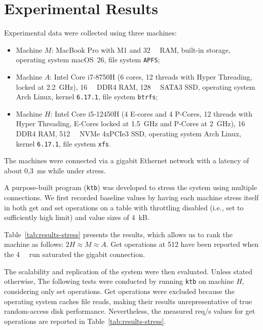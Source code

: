 \section{Experimental Results}
\label{sec:results}

Experimental data were collected using three machines:
\begin{itemize}
    \item Machine $M$: MacBook Pro with M1 and \SI{32}{\giga\byte} RAM, built-in storage, operating system macOS~26, file system \texttt{APFS};
    \item Machine $A$: Intel Core i7-8750H (6 cores, 12 threads with Hyper Threading, locked at \SI{2.2}{\giga\hertz}), \SI{16}{\giga\byte} DDR4 RAM, \SI{128}{\giga\byte} SATA3 SSD, operating system Arch Linux, kernel \texttt{6.17.1}, file system \texttt{btrfs};
    \item Machine $H$: Intel Core i5-12450H (4 E-cores and 4 P-Cores, 12 threads with Hyper Threading, E-Cores locked at \SI{1.5}{\giga\hertz} and P-Cores at \SI{2}{\giga\hertz}), \SI{16}{\giga\byte} DDR4 RAM, \SI{512}{\giga\byte} NVMe 4xPCIe3 SSD, operating system Arch Linux, kernel \texttt{6.17.1}, file system \texttt{xfs}.
\end{itemize}

The machines were connected via a gigabit Ethernet network with a latency of about 0{,}3~ms while under stress.

A purpose-built program (\texttt{ktb}) was developed to stress the system using multiple connections.
We first recorded baseline values by having each machine stress itself in both get and set operations
on a table with throttling disabled (i.e., set to sufficiently high limit) and value sizes of 4~kB\@.

Table~\ref{tab:results-stress} presents the results, which allows us to rank the machine as follows: $2H \approx M \approx A$.
Get operations at \SI{512}{\byte} have been reported when the \SI{4}{\kilo\byte} run saturated the gigabit connection.

The scalability and replication of the system were then evaluated.
Unless stated otherwise, The following tests were conducted by running \texttt{ktb} on machine $H$, considering only set operations.
Get operations were excluded because the operating system caches file reads, making their results unrepresentative of true random-access disk performance.
Nevertheless, the measured req/s values for get operations are reported in Table~\ref{tab:results-stress}.


